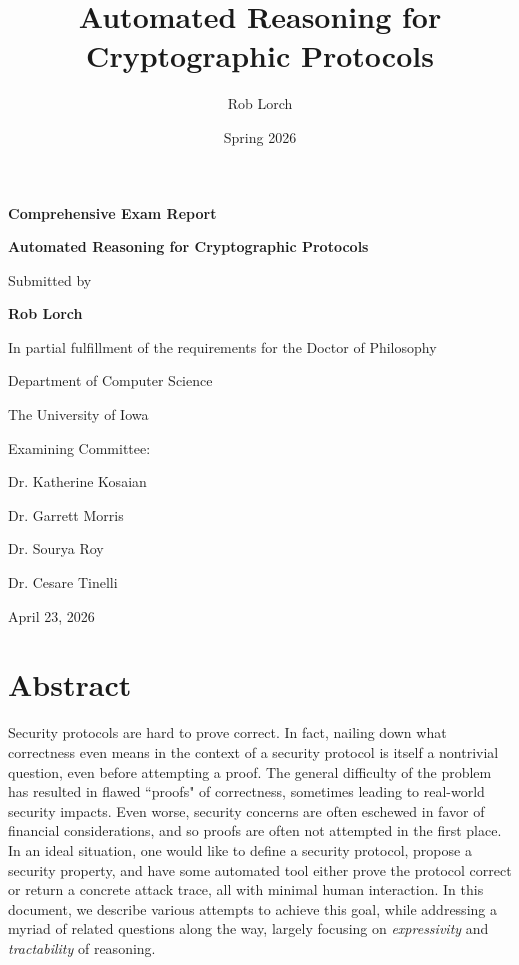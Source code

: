 \documentclass{article}
\title{Automated Reasoning for Cryptographic Protocols}
\author{Rob Lorch}
\date{Spring 2026}
\theoremstyle{definition}
\begin{document}
\begin{titlepage}
    \centering

    {\Large \textbf{Comprehensive Exam Report} \par}
    \vspace{0.5in}

    {\LARGE \textbf{Automated Reasoning for Cryptographic Protocols} \par}
    \vspace{.75in}

    {\large
    Submitted by\par
    \vspace{0.2in}
    \textbf{Rob Lorch}\par
    }
    \vspace{0.55in}

    {\large
    In partial fulfillment of the requirements for the Doctor of Philosophy\par
    Department of Computer Science\par
    The University of Iowa\par
    }
    \vspace{0.75in}

    {\large
    Examining Committee:\par
    \vspace{0.2in}
    Dr. Katherine Kosaian\par
    Dr. Garrett Morris\par
    Dr. Sourya Roy\par
    Dr. Cesare Tinelli\par
    }
    \vspace{1in}

    {\large
    April 23, 2026\par
    }

    \vfill
\end{titlepage}

\section{Abstract}

Security protocols are hard to prove correct. In fact, nailing down what correctness  
even means in the context of a security protocol is itself a nontrivial question, even before attempting a proof. 
The general difficulty of the problem has resulted in flawed ``proofs" of correctness, sometimes leading to real-world security impacts. 
Even worse, security concerns are often eschewed in favor of financial considerations, 
and so proofs are often not attempted in the first place.
In an ideal situation, one would like to define a security protocol, propose a security property, 
and have some automated tool either prove the protocol correct or return a concrete attack trace,
all with minimal human interaction. In this document, we describe various attempts to achieve this goal, 
while addressing a myriad of related questions along the way, 
largely focusing on \emph{expressivity} and \emph{tractability} of reasoning.
\end{document}
